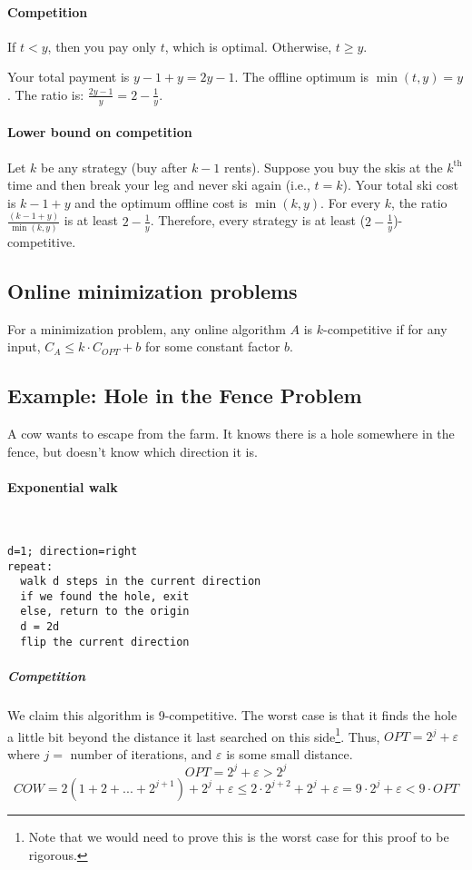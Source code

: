 \documentclass[a4paper]{article}
\begin{document}
\paragraph{Competition}
If $t<y$, then you pay only $t$, which is optimal. Otherwise, $t\ge y$.

Your total payment is $y-1+y=2y-1$.
The offline optimum is $\min(t,y)=y$.
The ratio is: $\frac{2y-1}{y}=2-\frac{1}{y}$.

\paragraph{Lower bound on competition}
Let $k$ be any strategy (buy after $k-1$ rents).
Suppose you buy the skis at the $k^\text{th}$ time and then break your leg and never ski again (i.e., $t=k$).
Your total ski cost is $k-1+y$ and the optimum offline cost is $\min(k,y)$.
For every $k$, the ratio $\frac{(k-1+y)}{\min(k,y)}$ is at least $2-\frac{1}{y}$.
Therefore, every strategy is at least ($2-\frac{1}{y}$)-competitive.

\subsection{Online minimization problems}
For a minimization problem, any online algorithm $A$ is $k$-competitive if for any input, $C_A \le k \cdot C_{OPT} + b$ for some constant factor $b$.

\subsection{Example: Hole in the Fence Problem}
A cow wants to escape from the farm. It knows there is a hole somewhere in the fence, but doesn't know which direction it is.

\paragraph{Exponential walk}\ \\
\begin{lstlisting}[frame=L]
d=1; direction=right
repeat:
  walk d steps in the current direction
  if we found the hole, exit
  else, return to the origin
  d = 2d
  flip the current direction
\end{lstlisting}

\subparagraph{Competition}
We claim this algorithm is 9-competitive.
The worst case is that it finds the hole a little bit beyond the distance it last searched on this side\footnote{Note that we would need to prove this is the worst case for this proof to be rigorous.}.
Thus, $OPT=2^j+\varepsilon$ where $j=$ number of iterations, and $\varepsilon$ is some small distance.
\[OPT=2^j+\varepsilon > 2^j\]
\[COW=2(1+2+...+2^{j+1})+2^j+\varepsilon \le 2\cdot2^{j+2}+2^j+\varepsilon=9 \cdot 2^j+\varepsilon < 9 \cdot OPT\]
\end{document}
